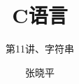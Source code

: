 \documentclass[11pt,notheorems]{beamer}
\begin{document}
\title{C语言}
\subtitle{第11讲、字符串}
\author{张晓平}


\begin{frame}[plain]\transboxout
\titlepage
\end{frame}

\begin{frame}[allowframebreaks]\transboxin
\begin{center}
\tableofcontents[hideallsubsections]
\end{center}
\end{frame}


                  




\end{document}
